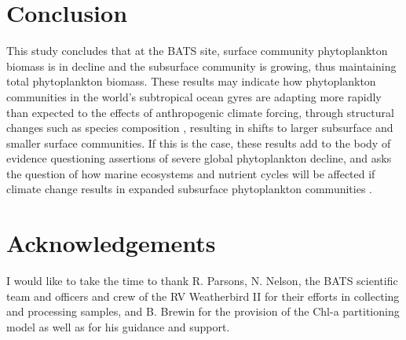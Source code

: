 \documentclass{article}
\begin{document}
\section{Conclusion}
This study concludes that at the BATS site, surface community phytoplankton biomass is in decline and the subsurface community is growing, thus maintaining total phytoplankton biomass. These results may indicate how phytoplankton communities in the world’s subtropical ocean gyres are adapting more rapidly than expected to the effects of anthropogenic climate forcing, through structural changes such as species composition \citep{lomas_adaptive_2022}, resulting in shifts to larger subsurface and smaller surface communities. If this is the case, these results add to the body of evidence questioning assertions of severe global phytoplankton decline, and asks the question of how marine ecosystems and nutrient cycles will be affected if climate change results in expanded subsurface phytoplankton communities \citep{mcmahon_millennial-scale_2015,boyce_global_2010,falkowski_role_1994,mcquatters-gollop_is_2011}.
\section{Acknowledgements}
I would like to take the time to thank R. Parsons, N. Nelson, the BATS scientific team and officers and crew of the RV Weatherbird II for their efforts in collecting and processing samples, and B. Brewin for the provision of the Chl-a partitioning model as well as for his guidance and support.
\small
%
% 



\end{document}
